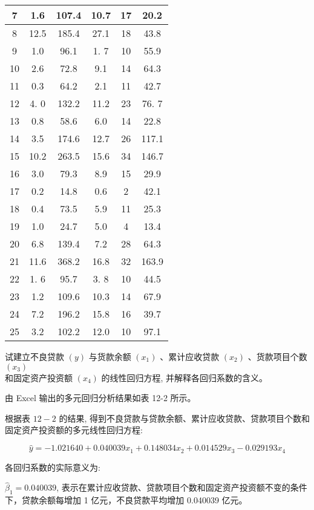 \documentclass[10pt]{article}
\begin{document}
\begin{CJK*}{UTF8}{bsmi}
\begin{center}
\begin{tabular}{|c|c|c|c|c|c|}
\hline
7 & 1.6 & 107.4 & 10.7 & 17 & 20.2 \\
\hline
8 & 12.5 & 185.4 & 27.1 & 18 & 43.8 \\
\hline
9 & 1.0 & 96.1 & 1. 7 & 10 & 55.9 \\
\hline
10 & 2.6 & 72.8 & 9.1 & 14 & 64.3 \\
\hline
11 & 0.3 & 64.2 & 2.1 & 11 & 42.7 \\
\hline
12 & 4. 0 & 132.2 & 11.2 & 23 & 76. 7 \\
\hline
13 & 0.8 & 58.6 & 6.0 & 14 & 22.8 \\
\hline
14 & 3.5 & 174.6 & 12.7 & 26 & 117.1 \\
\hline
15 & 10.2 & 263.5 & 15.6 & 34 & 146.7 \\
\hline
16 & 3.0 & 79.3 & 8.9 & 15 & 29.9 \\
\hline
17 & 0.2 & 14.8 & 0.6 & 2 & 42.1 \\
\hline
18 & 0.4 & 73.5 & 5.9 & 11 & 25.3 \\
\hline
19 & 1.0 & 24.7 & 5.0 & 4 & 13.4 \\
\hline
20 & 6.8 & 139.4 & 7.2 & 28 & 64.3 \\
\hline
21 & 11.6 & 368.2 & 16.8 & 32 & 163.9 \\
\hline
22 & 1. 6 & 95.7 & 3. 8 & 10 & 44.5 \\
\hline
23 & 1.2 & 109.6 & 10.3 & 14 & 67.9 \\
\hline
24 & 7.2 & 196.2 & 15.8 & 16 & 39.7 \\
\hline
25 & 3.2 & 102.2 & 12.0 & 10 & 97.1 \\
\hline
\end{tabular}
\end{center}

试建立不良贷款 $(y)$ 与货款余额 $\left(x_{1}\right)$ 、累计应收贷款 $\left(x_{2}\right)$ 、货款项目个数 $\left(x_{3}\right)$\\
和固定资产投资额 $\left(x_{4}\right)$ 的线性回归方程, 并解释各回归系数的含义。

由 Excel 输出的多元回归分析结果如表 12-2 所示。

根据表 $12-2$ 的结果, 得到不良贷款与贷款余额、累计应收贷款、贷款项目个数和固定资产投资额的多元线性回归方程:

$$
\hat{y}=-1.021640+0.040039 x_{1}+0.148034 x_{2}+0.014529 x_{3}-0.029193 x_{4}
$$

各回归系数的实际意义为:

$\hat{\beta}_{1}=0.040039$, 表示在累计应收贷款、贷款项目个数和固定资产投资额不变的条件下，贷款余额每增加 1 亿元，不良贷款平均增加 0.040039 亿元。


\end{CJK*}
\end{document}
